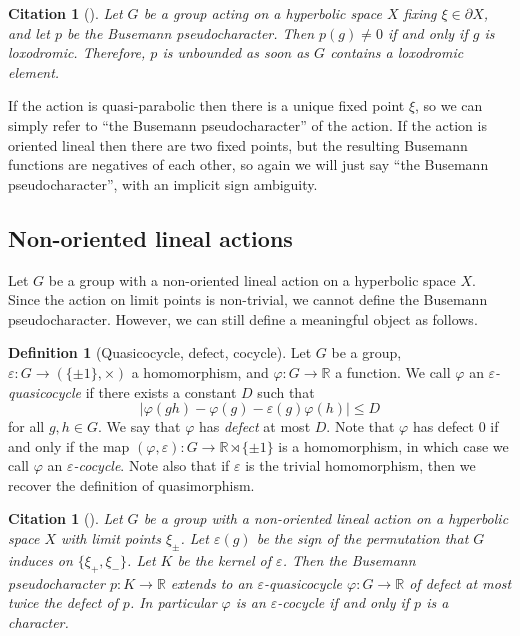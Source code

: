 \documentclass[reqno,12pt]{amsart}\setcounter{tocdepth}{1}
\newtheorem{cit}[theorem]{Citation}
\theoremstyle{definition}
\newtheorem{definition}[theorem]{Definition}
\newcommand{\R}{\mathbb{R}}
\numberwithin{equation}{section}
\begin{document}
\begin{cit}[{\cite[Section 4.1]{manning}}]
\label{cit:busemann:loxodromic}
    Let $G$ be a group acting on a hyperbolic space $X$ fixing $\xi \in \partial X$, and let $p$ be the Busemann pseudocharacter. Then $p(g) \neq 0$ if and only if $g$ is loxodromic. Therefore, $p$ is unbounded as soon as $G$ contains a loxodromic element.
\end{cit}

If the action is quasi-parabolic then there is a unique fixed point $\xi$, so we can simply refer to ``the Busemann pseudocharacter'' of the action. If the action is oriented lineal then there are two fixed points, but the resulting Busemann functions are negatives of each other, so again we will just say ``the Busemann pseudocharacter'', with an implicit sign ambiguity.


\subsection{Non-oriented lineal actions}

Let $G$ be a group with a non-oriented lineal action on a hyperbolic space $X$. Since the action on limit points is non-trivial, we cannot define the Busemann pseudocharacter. However, we can still define a meaningful object as follows.

\begin{definition}[Quasicocycle, defect, cocycle]
    Let $G$ be a group, $\varepsilon \colon G \to (\{ \pm 1 \}, \times)$ a homomorphism, and $\varphi \colon G \to \R$ a function. We call $\varphi$ an \emph{$\varepsilon$-quasicocycle} if there exists a constant $D$ such that
    \[ |\varphi(gh) - \varphi(g) - \varepsilon(g)\varphi(h)| \leq D\]
    for all $g, h \in G$. We say that $\varphi$ has \emph{defect} at most $D$. Note that $\varphi$ has defect $0$ if and only if the map $(\varphi, \varepsilon) \colon G \to \R \rtimes \{ \pm 1 \}$ is a homomorphism, in which case we call $\varphi$ an \emph{$\varepsilon$-cocycle}. Note also that if $\varepsilon$ is the trivial homomorphism, then we recover the definition of quasimorphism.
\end{definition}

\begin{cit}[{\cite[Proposition 2.10]{NL}}]
\label{cit:quasicocycle}
    Let $G$ be a group with a non-oriented lineal action on a hyperbolic space $X$ with limit points $\xi_{\pm}$. Let $\varepsilon(g)$ be the sign of the permutation that $G$ induces on $\{ \xi_+, \xi_- \}$. Let $K$ be the kernel of $\varepsilon$. Then the Busemann pseudocharacter $p \colon K \to \R$ extends to an $\varepsilon$-quasicocycle $\varphi \colon G \to \R$ of defect at most twice the defect of $p$. In particular $\varphi$ is an $\varepsilon$-cocycle if and only if $p$ is a character.
\end{cit}
\end{document}
